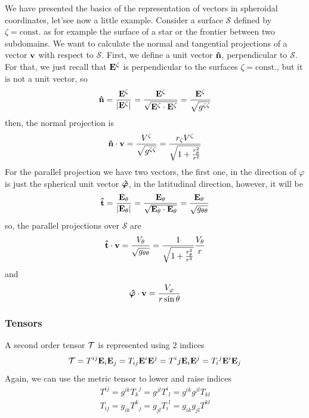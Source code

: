 We have presented the basics of the representation of vectors in spheroidal coordinates, let'see now a little
example. Consider a surface $\mathcal S$ defined by $\zeta=\mathrm{const.}$ as for example the surface
of a star or the frontier between two subdomains. We want to calculate the normal and tangential
projections of a vector $\mathbf{v}$ with respect to $\mathcal{S}$. First, we define a unit vector $\mathbf{\hat n}$,
perpendicular to $\mathcal{S}$. For that, we just recall that $\mathbf{E}^\zeta$ is perpendicular to 
the surfaces $\zeta=\mathrm{const.}$, but it is not a unit vector, so
\begin{equation}
\mathbf{\hat n}=\frac{\mathbf{E^\zeta}}{|\mathbf{E^\zeta}|}=
\frac{\mathbf{E^\zeta}}{\sqrt{\mathbf{E^\zeta}\cdot\mathbf{E^\zeta}}}=
\frac{\mathbf{E^\zeta}}{\sqrt{g^{\zeta\zeta}}}
\end{equation}
then, the normal projection is
\begin{equation}
\mathbf{\hat n}\cdot\mathbf{v}=\frac{V^\zeta}{\sqrt{g^{\zeta\zeta}}}=
\frac{r_\zeta V^\zeta}{\sqrt{1+\frac{r_\theta^2}{r^2}}}
\end{equation}
For the parallel projection we have two vectors, the first one, in the direction of $\varphi$ is just 
the spherical unit vector $\boldsymbol{\hat \varphi}$, in the latitudinal direction, however, it will be
\begin{equation}
\mathbf{\hat t}=\frac{\mathbf{E_\theta}}{|\mathbf{E_\theta}|}=
\frac{\mathbf{E_\theta}}{\sqrt{\mathbf{E_\theta}\cdot\mathbf{E_\theta}}}=
\frac{\mathbf{E_\theta}}{\sqrt{g_{\theta\theta}}}
\end{equation}
so, the parallel projections over $\mathcal{S}$ are
\begin{equation}
\mathbf{\hat t}\cdot\mathbf{v}=\frac{V_\theta}{\sqrt{g_{\theta\theta}}}=
\frac{1}{\sqrt{1+\frac{r_\theta^2}{r^2}}}\frac{V_\theta}{r}
\end{equation}
and
\begin{equation}
\boldsymbol{\hat \varphi}\cdot\mathbf{v}=\frac{V_\varphi}{r\sin\theta}
\end{equation}

\subsubsection{Tensors}

A second order tensor $\mathcal{T}$ is represented using 2 indices
\begin{equation}
\mathcal{T}=T^{ij}\mathbf{E}_i\mathbf{E}_j=T_{ij}\mathbf{E}^i\mathbf{E}^j={T^i}j\mathbf{E}_i\mathbf{E}^j
={T_i}^j\mathbf{E}^i\mathbf{E}_j
\end{equation}
Again, we can use the metric tensor to lower and raise indices
\begin{equation}
\begin{array}{l}
T^{ij}=g^{ik}{T_k}^j=g^{jl}{T^i}_l=g^{ik}g^{jl}T_{kl}\\
T_{ij}=g_{ik}{T^k}_j=g_{jl}{T_i}^l=g_{ik}g_{jl}T^{kl}
\end{array}
\end{equation}

